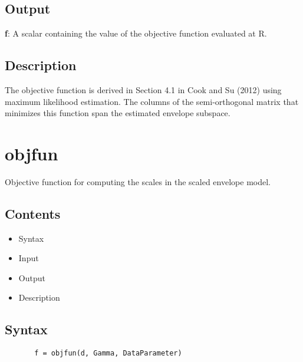 \documentclass[a4paper,11pt,openany]{memoir}
\begin{document}
\subsection*{Output}

\begin{par}
\textbf{f}: A scalar containing the value of the objective function evaluated at R.
\end{par} \vspace{1em}


\subsection*{Description}

\begin{par}
The objective function is derived in Section 4.1 in Cook and Su (2012) using maximum likelihood estimation. The columns of the semi-orthogonal matrix that minimizes this function span the estimated envelope subspace.
\end{par} \vspace{1em}


\newpage

\rmfamily
\color{black}\section{objfun}

\begin{par}
Objective function for computing the scales in the scaled envelope model.
\end{par} \vspace{1em}

\subsection*{Contents}

\begin{itemize}
\setlength{\itemsep}{-1ex}
   \item Syntax
   \item Input
   \item Output
   \item Description
\end{itemize}


\subsection*{Syntax}


\begin{verbatim}       f = objfun(d, Gamma, DataParameter)\end{verbatim}
    
\end{document}

